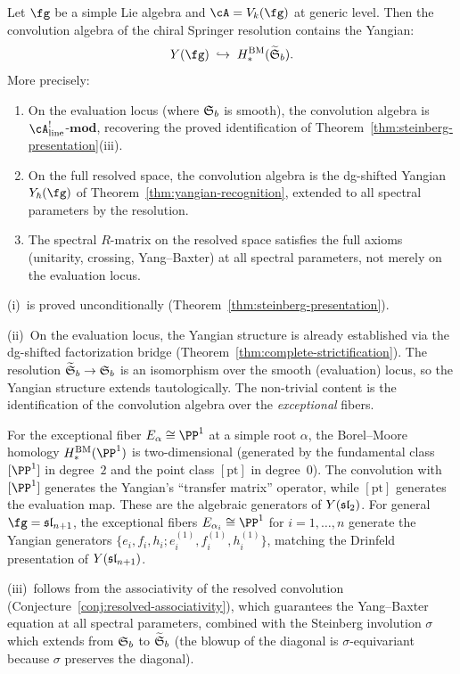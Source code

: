 \begin{conjecture}
\label{conj:yangian-springer}
\ClaimStatusConjectured
{}
Let $\fg$ be a simple Lie algebra and $\cA = V_k(\fg)$ at generic
level. Then the convolution algebra of the chiral Springer resolution
contains the Yangian:
\[
Y(\fg) \;\hookrightarrow\;
H_*^{\mathrm{BM}}(\widetilde{\Steinberg}_b).
\]
More precisely:
\begin{enumerate}[label=\textup{(\roman*)}]
\item On the evaluation locus \textup{(}where $\mathfrak{S}_b$ is
 smooth\textup{)}, the convolution algebra is
 $\cA^!_{\mathrm{line}}$-$\mathbf{mod}$, recovering the proved
 identification of
 Theorem~\textup{\ref{thm:steinberg-presentation}(iii)}.
\item On the full resolved space, the convolution algebra is the
 dg-shifted Yangian $Y_\hbar(\fg)$ of
 Theorem~\textup{\ref{thm:yangian-recognition}}, extended to all
 spectral parameters by the resolution.
\item The spectral $R$-matrix on the resolved space satisfies the
 full axioms \textup{(}unitarity, crossing, Yang--Baxter\textup{)}
 at all spectral parameters, not merely on the evaluation locus.
\end{enumerate}
\end{conjecture}

\begin{remark}[Evidence]
(i)~is proved unconditionally
(Theorem~\ref{thm:steinberg-presentation}).

(ii)~On the evaluation locus, the Yangian structure is already
established via the dg-shifted factorization bridge
(Theorem~\ref{thm:complete-strictification}). The resolution
$\widetilde{\mathfrak{S}}_b \to \mathfrak{S}_b$ is an isomorphism
over the smooth (evaluation) locus, so the Yangian structure extends
tautologically. The non-trivial content is the identification of the
convolution algebra over the \emph{exceptional} fibers.

For the exceptional fiber $E_\alpha \cong \PP^1$ at a simple root
$\alpha$, the Borel--Moore homology $H_*^{\mathrm{BM}}(\PP^1)$ is
two-dimensional (generated by the fundamental class $[\PP^1]$ in
degree~$2$ and the point class $[\mathrm{pt}]$ in degree~$0$).
The convolution with $[\PP^1]$ generates the Yangian's ``transfer
matrix'' operator, while $[\mathrm{pt}]$ generates the evaluation
map. These are the algebraic generators of $Y(\mathfrak{sl}_2)$.
For general $\fg = \fsl_{n+1}$, the exceptional fibers
$E_{\alpha_i} \cong \PP^1$ for $i = 1, \ldots, n$ generate
the Yangian generators $\{e_i, f_i, h_i; e_i^{(1)}, f_i^{(1)},
h_i^{(1)}\}$, matching the Drinfeld presentation of $Y(\mathfrak{sl}_{n+1})$.

(iii)~follows from the associativity of the resolved convolution
(Conjecture~\ref{conj:resolved-associativity}), which guarantees the
Yang--Baxter equation at all spectral parameters, combined with the
Steinberg involution $\sigma$ which extends from $\mathfrak{S}_b$ to
$\widetilde{\mathfrak{S}}_b$ (the blowup of the diagonal is
$\sigma$-equivariant because $\sigma$ preserves the diagonal).
\end{remark}

